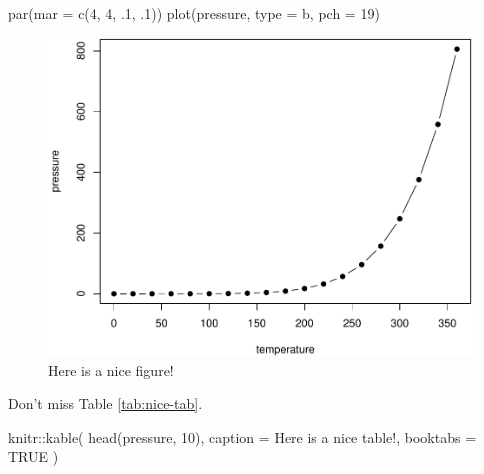 \documentclass[12pt, oneside, openright]{byuthesis}
\newenvironment{Shaded}{\begin{snugshade}}{\end{snugshade}}
\newcommand{\AttributeTok}[1]{\textcolor[rgb]{0.77,0.63,0.00}{#1}}
\newcommand{\ConstantTok}[1]{\textcolor[rgb]{0.00,0.00,0.00}{#1}}
\newcommand{\DecValTok}[1]{\textcolor[rgb]{0.00,0.00,0.81}{#1}}
\newcommand{\FunctionTok}[1]{\textcolor[rgb]{0.00,0.00,0.00}{#1}}
\newcommand{\NormalTok}[1]{#1}
\newcommand{\SpecialCharTok}[1]{\textcolor[rgb]{0.00,0.00,0.00}{#1}}
\newcommand{\StringTok}[1]{\textcolor[rgb]{0.31,0.60,0.02}{#1}}
\begin{document}
\begin{Shaded}
\begin{Highlighting}[]
\FunctionTok{par}\NormalTok{(}\AttributeTok{mar =} \FunctionTok{c}\NormalTok{(}\DecValTok{4}\NormalTok{, }\DecValTok{4}\NormalTok{, .}\DecValTok{1}\NormalTok{, .}\DecValTok{1}\NormalTok{))}
\FunctionTok{plot}\NormalTok{(pressure, }\AttributeTok{type =} \StringTok{\textquotesingle{}b\textquotesingle{}}\NormalTok{, }\AttributeTok{pch =} \DecValTok{19}\NormalTok{)}
\end{Highlighting}
\end{Shaded}

\begin{figure}

{\centering \includegraphics[width=0.8\linewidth]{thesis_files/figure-latex/nice-fig-1} 

}

\caption{Here is a nice figure!}\label{fig:nice-fig}
\end{figure}

Don't miss Table \ref{tab:nice-tab}.

\begin{Shaded}
\begin{Highlighting}[]
\NormalTok{knitr}\SpecialCharTok{::}\FunctionTok{kable}\NormalTok{(}
  \FunctionTok{head}\NormalTok{(pressure, }\DecValTok{10}\NormalTok{), }\AttributeTok{caption =} \StringTok{\textquotesingle{}Here is a nice table!\textquotesingle{}}\NormalTok{,}
  \AttributeTok{booktabs =} \ConstantTok{TRUE}
\NormalTok{)}
\end{Highlighting}
\end{Shaded}
\end{document}
